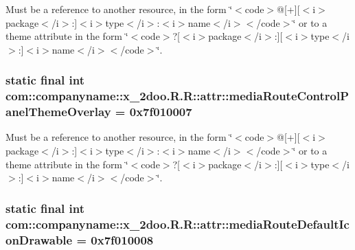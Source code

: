 Must be a reference to another resource, in the form \char`\"{}$<$code$>$@\mbox{[}+\mbox{]}\mbox{[}$<$i$>$package$<$/i$>$:\mbox{]}$<$i$>$type$<$/i$>$:$<$i$>$name$<$/i$>$$<$/code$>$\char`\"{} or to a theme attribute in the form \char`\"{}$<$code$>$?\mbox{[}$<$i$>$package$<$/i$>$:\mbox{]}\mbox{[}$<$i$>$type$<$/i$>$:\mbox{]}$<$i$>$name$<$/i$>$$<$/code$>$\char`\"{}. \hypertarget{classcom_1_1companyname_1_1x__2doo_1_1_r_1_1attr_f435373e375110029229eb3eaa167825}{
\subsubsection[{mediaRouteControlPanelThemeOverlay}]{\setlength{\rightskip}{0pt plus 5cm}static final int com::companyname::x\_\-2doo.R.R::attr::mediaRouteControlPanelThemeOverlay = 0x7f010007}}
\label{classcom_1_1companyname_1_1x__2doo_1_1_r_1_1attr_f435373e375110029229eb3eaa167825}


Must be a reference to another resource, in the form \char`\"{}$<$code$>$@\mbox{[}+\mbox{]}\mbox{[}$<$i$>$package$<$/i$>$:\mbox{]}$<$i$>$type$<$/i$>$:$<$i$>$name$<$/i$>$$<$/code$>$\char`\"{} or to a theme attribute in the form \char`\"{}$<$code$>$?\mbox{[}$<$i$>$package$<$/i$>$:\mbox{]}\mbox{[}$<$i$>$type$<$/i$>$:\mbox{]}$<$i$>$name$<$/i$>$$<$/code$>$\char`\"{}. \hypertarget{classcom_1_1companyname_1_1x__2doo_1_1_r_1_1attr_b1ca73e37e3c99f3035a2356671d4ef4}{
\subsubsection[{mediaRouteDefaultIconDrawable}]{\setlength{\rightskip}{0pt plus 5cm}static final int com::companyname::x\_\-2doo.R.R::attr::mediaRouteDefaultIconDrawable = 0x7f010008}}
\label{classcom_1_1companyname_1_1x__2doo_1_1_r_1_1attr_b1ca73e37e3c99f3035a2356671d4ef4}


